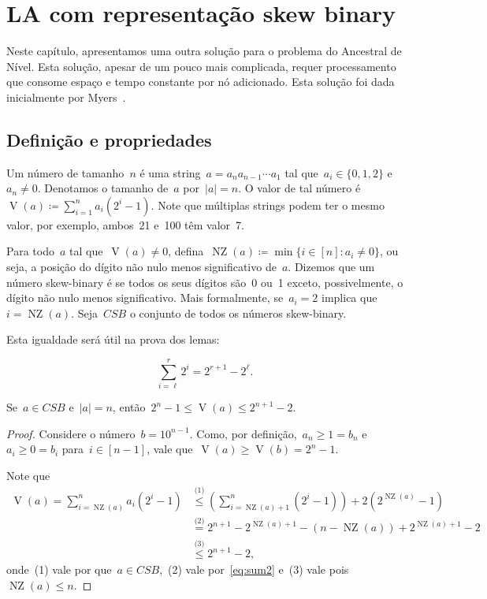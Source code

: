 \documentclass[main.tex]{subfiles}
\newcommand{\NZ}{\operatorname{NZ}}
\newcommand{\CSB}{\textit{CSB}}
\renewcommand{\V}{\operatorname{V}}
\begin{document}
\chapter{LA com representação skew binary} \label{cap:skew}

Neste capítulo, apresentamos uma outra solução para o problema do Ancestral de Nível. Esta solução, apesar de um pouco mais complicada, requer processamento que consome espaço e tempo constante por nó adicionado. Esta solução foi dada inicialmente por Myers~\cite{Myers83}.

\section{Definição e propriedades}

Um número  de tamanho~$n$ é uma string~${a = a_n a_{n-1} \cdots a_1}$ tal que~${a_i \in \{0, 1, 2\}}$ e~$a_n \neq 0$. Denotamos o tamanho de~$a$ por~$|a| = n$. O valor de tal número é~${\V(a) \coloneqq \sum\limits_{i = 1}^n{a_i (2^i - 1)}}$. Note que múltiplas strings podem ter o mesmo valor, por exemplo, ambos~21 e~100 têm valor~7.

Para todo~$a$ tal que~$\V(a) \neq 0$, defina~$\NZ(a) \coloneqq \min\{i \in [n] : a_i \neq 0\}$, ou seja, a posição do dígito não nulo menos significativo de~$a$. Dizemos que um número skew-binary é  se todos os seus dígitos são~0 ou~1 exceto, possivelmente, o dígito não nulo menos significativo. Mais formalmente, se~${a_i = 2}$ implica que ${i = \NZ(a)}$. Seja~$\CSB$ o conjunto de todos os números skew-binary.

Esta igualdade será útil na prova dos lemas:

\begin{equation} \tag{A} \label{eq:sum2}
	\sum\limits_{i = \ell}^r{2^i} = 2^{r+1} - 2^{\ell}.
\end{equation}

\begin{lemma} \label{lem:csbdig}
	Se~$a \in \CSB$ e~$|a| = n$, então~$2^n - 1 \leq \V(a) \leq 2^{n+1}-2$.
\end{lemma}
\begin{proof}
	Considere o número~$b = 10^{n-1}$. Como, por definição,~$a_n \geq 1 = b_n$ e~$a_i \geq 0 = b_i$ para~$i \in [n - 1]$, vale que~$\V(a) \geq \V(b) = 2^n - 1$.

	Note que
	\begin{align*}
	\V(a) = \sum\limits_{i = \NZ(a)}^n{a_i (2^i - 1)} &\stackrel{\text{(1)}}{\leq} \left(\sum\limits_{i = \NZ(a) + 1}^n (2^i - 1)\right) + 2 (2^{\NZ(a)} - 1) \\
	&\stackrel{\text{(2)}}{=} 2^{n+1} - 2^{\NZ(a)+1} - (n - \NZ(a)) + 2^{\NZ(a) + 1} - 2 \\
	&\stackrel{\text{(3)}}{\leq} 2^{n+1} - 2,
	\end{align*}
	onde~(1) vale por que~$a \in \CSB$,~(2) vale por~\eqref{eq:sum2} e~(3) vale pois~$\NZ(a) \leq n$.
\end{proof}
\end{document}
